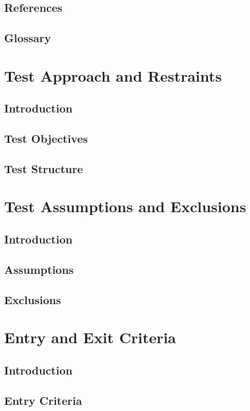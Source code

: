 \documentclass{article}
\begin{document}
\subsection{References}
\subsection{Glossary}

\section{Test Approach and Restraints}

\subsection{Introduction}
\subsection{Test Objectives}
\subsection{Test Structure}

\section{Test Assumptions and Exclusions}

\subsection{Introduction}
\subsection{Assumptions}
\subsection{Exclusions}

\section{Entry and Exit Criteria}

\subsection{Introduction}
\subsection{Entry Criteria}
\end{document}
